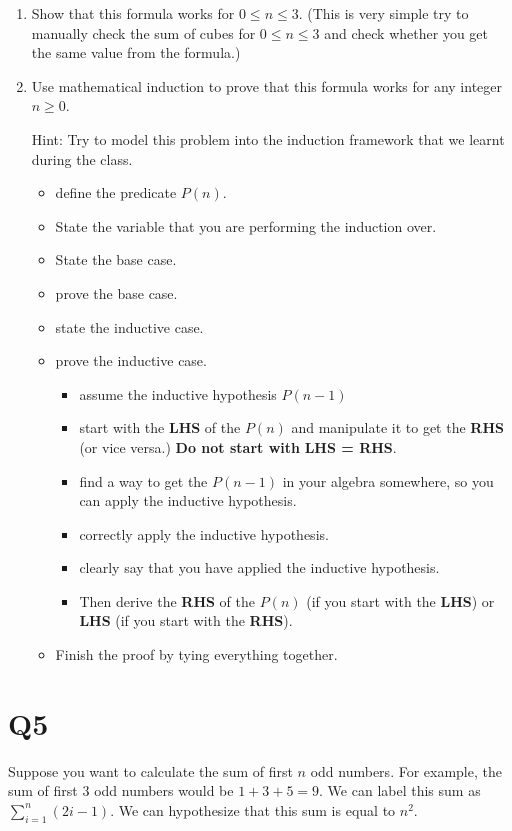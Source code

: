 \documentclass[12pt]{exam}
\begin{document}
\begin{enumerate}
    \item Show that this formula works for $0 \leq n \leq 3$. (This is very simple try to manually check the sum of cubes for $0 \leq n \leq 3$ and check whether you get the same value from the formula.)
    \item Use mathematical induction to prove that this formula works for any integer $n \geq 0$.
    
    Hint: Try to model this problem into the induction framework that we learnt during the class. 
    \begin{itemize}
        \item define the predicate $P(n)$.
        \item State the variable that you are performing the induction over.
        \item State the base case.
        \item prove the base case.
        \item state the inductive case.
        \item prove the inductive case.
            \begin{itemize}
                \item assume the inductive hypothesis $P(n-1)$
                \item start with the \textbf{LHS} of the $P(n)$ and manipulate it to get the \textbf{RHS} (or vice versa.) \textbf{Do not start with }\textbf{LHS = RHS}.
                \item find a way to get the $P(n-1)$ in your algebra somewhere, so you can apply the inductive hypothesis.
                \item correctly apply the inductive hypothesis.
                \item clearly say that you have applied the inductive hypothesis.
                \item Then derive the \textbf{RHS} of the $P(n)$ (if you start with the \textbf{LHS}) or \textbf{LHS} (if you start with the \textbf{RHS}).
            \end{itemize}
        \item Finish the proof by tying everything together.
    \end{itemize}
\end{enumerate}


\section{Q5}
Suppose you want to calculate the sum of first $n$ odd numbers. For example, the sum of first $3$ odd numbers would be $1 + 3 + 5 = 9$. We can label this sum as $\sum_{i=1}^{n} (2i - 1)$. We can hypothesize that this sum is equal to $n^2$.
\end{document}
